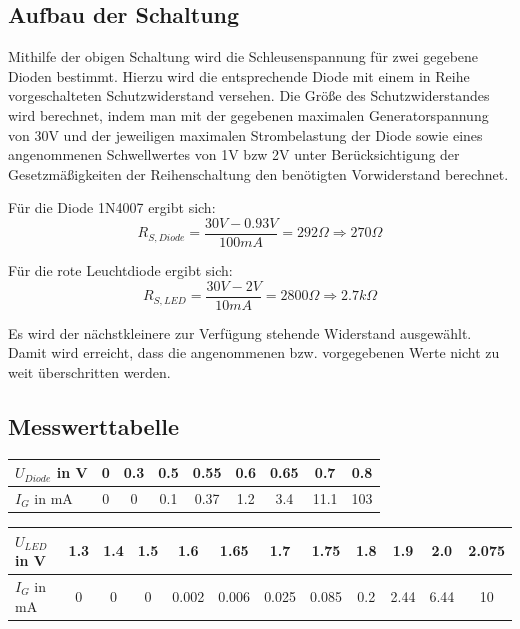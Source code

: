 \documentclass[
a4paper,     %
 headsepline, %
11pt         %
]{scrartcl}  %
\begin{document}
\subsection{Aufbau der Schaltung}

Mithilfe der obigen Schaltung wird die Schleusenspannung für zwei gegebene Dioden bestimmt. Hierzu wird die entsprechende Diode mit einem in Reihe vorgeschalteten Schutzwiderstand versehen. Die Größe des Schutzwiderstandes wird berechnet, indem man mit der gegebenen maximalen Generatorspannung von 30V und der jeweiligen maximalen Strombelastung der Diode sowie eines angenommenen Schwellwertes von 1V bzw 2V unter Berücksichtigung der Gesetzmäßigkeiten der Reihenschaltung den benötigten Vorwiderstand berechnet.

Für die Diode 1N4007 ergibt sich:
\[R_{S,Diode}=\frac{30V-0.93V}{100mA}=292\Omega \Rightarrow 270\Omega\]

Für die rote Leuchtdiode ergibt sich:
\[R_{S,LED}=\frac{30V-2V}{10mA}=2800\Omega \Rightarrow 2.7k\Omega\]

Es wird der nächstkleinere zur Verfügung stehende Widerstand ausgewählt. Damit wird erreicht, dass die angenommenen bzw. vorgegebenen Werte nicht zu weit überschritten werden.

\subsection{Messwerttabelle}

  \begin{tabular}{ l | c | c | c | c | c | c | c | c }
    \hline
    $U_{Diode}$ in V & 0    & 0.3    & 0.5    & 0.55    & 0.6   & 0.65    & 0.7    & 0.8   \\ \hline
    $I_G$ in mA      & 0    & 0      & 0.1    & 0.37    & 1.2   & 3.4     & 11.1   & 103   \\
    \hline
  \end{tabular}
  \newline
  \begin{tabular}{ l | c | c | c | c | c | c | c | c | c | c | c }
    \hline
    $U_{LED}$ in V & 1.3  & 1.4 & 1.5 & 1.6   & 1.65  & 1.7   & 1.75   & 1.8  & 1.9  & 2.0  & 2.075 \\ \hline
    $I_G$ in mA    & 0    & 0   & 0   & 0.002 & 0.006 & 0.025 & 0.085  & 0.2  & 2.44 & 6.44 & 10    \\
    \hline
  \end{tabular}
\end{document}
